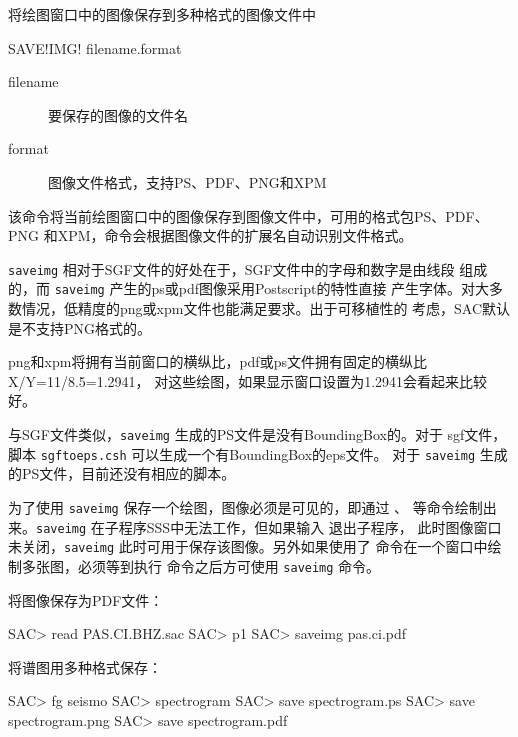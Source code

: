 \label{cmd:saveimg}

将绘图窗口中的图像保存到多种格式的图像文件中

\begin{SACSTX}
SAVE!IMG! filename.format
\end{SACSTX}

\begin{description}
\item [filename] 要保存的图像的文件名
\item [format] 图像文件格式，支持PS、PDF、PNG和XPM
\end{description}

该命令将当前绘图窗口中的图像保存到图像文件中，可用的格式包PS、PDF、PNG
和XPM，命令会根据图像文件的扩展名自动识别文件格式。

\texttt{saveimg} 相对于SGF文件的好处在于，SGF文件中的字母和数字是由线段
组成的，而 \texttt{saveimg} 产生的ps或pdf图像采用Postscript的特性直接
产生字体。对大多数情况，低精度的png或xpm文件也能满足要求。出于可移植性的
考虑，SAC默认是不支持PNG格式的。

png和xpm将拥有当前窗口的横纵比，pdf或ps文件拥有固定的横纵比X/Y=11/8.5=1.2941，
对这些绘图，如果显示窗口设置为1.2941会看起来比较好。

与SGF文件类似，\texttt{saveimg} 生成的PS文件是没有BoundingBox的。对于
sgf文件，脚本 \texttt{sgftoeps.csh} 可以生成一个有BoundingBox的eps文件。
对于 \texttt{saveimg} 生成的PS文件，目前还没有相应的脚本。

为了使用 \texttt{saveimg} 保存一个绘图，图像必须是可见的，即通过
、 等命令绘制出来。\texttt{saveimg}
在子程序SSS中无法工作，但如果输入  退出子程序，
此时图像窗口未关闭，\texttt{saveimg} 此时可用于保存该图像。另外如果使用了
 命令在一个窗口中绘制多张图，必须等到执行
 命令之后方可使用 \texttt{saveimg} 命令。

将图像保存为PDF文件：
\begin{SACCode}
SAC> read PAS.CI.BHZ.sac
SAC> p1
SAC> saveimg pas.ci.pdf
\end{SACCode}

将谱图用多种格式保存：
\begin{SACCode}
SAC> fg seismo
SAC> spectrogram
SAC> save spectrogram.ps
SAC> save spectrogram.png
SAC> save spectrogram.pdf
\end{SACCode}
